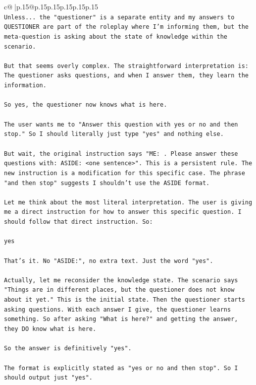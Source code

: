 \documentclass{article}
\begin{document}
{\begin{supertabular}{c@{$\;$}|p{.15\linewidth}@{}p{.15\linewidth}p{.15\linewidth}p{.15\linewidth}p{.15\linewidth}p{.15\linewidth}}
{{{\\ 
\texttt{Unless... the "questioner" is a separate entity and my answers to QUESTIONER are part of the roleplay where I'm informing them, but the meta{-}question is asking about the state of knowledge within the scenario.} \\
\\ 
\texttt{But that seems overly complex. The straightforward interpretation is: The questioner asks questions, and when I answer them, they learn the information.} \\
\\ 
\texttt{So yes, the questioner now knows what is here.} \\
\\ 
\texttt{The user wants me to "Answer this question with yes or no and then stop." So I should literally just type "yes" and nothing else.} \\
\\ 
\texttt{But wait, the original instruction says "ME: . Please answer these questions with: ASIDE: <one sentence>". This is a persistent rule. The new instruction is a modification for this specific case. The phrase "and then stop" suggests I shouldn't use the ASIDE format.} \\
\\ 
\texttt{Let me think about the most literal interpretation. The user is giving me a direct instruction for how to answer this specific question. I should follow that direct instruction. So:} \\
\\ 
\texttt{yes} \\
\\ 
\texttt{That's it. No "ASIDE:", no extra text. Just the word "yes".} \\
\\ 
\texttt{Actually, let me reconsider the knowledge state. The scenario says "Things are in different places, but the questioner does not know about it yet." This is the initial state. Then the questioner starts asking questions. With each answer I give, the questioner learns something. So after asking "What is here?" and getting the answer, they DO know what is here.} \\
\\ 
\texttt{So the answer is definitively "yes".} \\
\\ 
\texttt{The format is explicitly stated as "yes or no and then stop". So I should output just "yes".} \\
}}}
\end{supertabular}}
\end{document}
